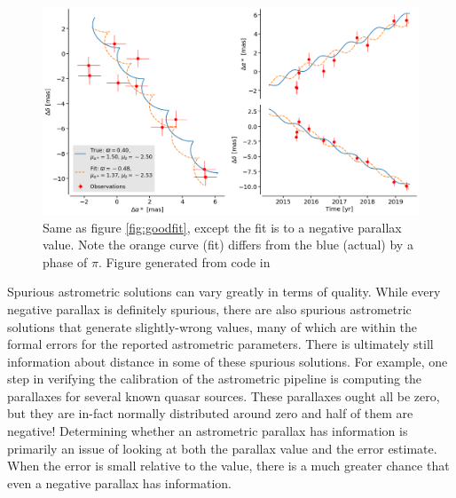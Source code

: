 \documentclass[twocolumn]{aastex631}
\begin{document}
\begin{figure}
	\includegraphics[width=\columnwidth]{astrometric-bad.png}
	\caption{Same as figure \ref{fig:goodfit}, except the fit is to a negative parallax value. Note the orange curve (fit) differs from the blue (actual) by a phase of $\pi$. Figure generated from code in \cite{luriGaia2018}}
	\label{fig:badfit}
\end{figure}



Spurious astrometric solutions can vary greatly in terms of quality. While every negative parallax is definitely spurious, there are also spurious astrometric solutions that generate slightly-wrong values, many of which are within the formal errors for the reported astrometric parameters. There is ultimately still information about distance in some of these spurious solutions. For example, one step in verifying the calibration of the astrometric pipeline is computing the parallaxes for several known quasar sources\citep{luriGaia2018}. These parallaxes ought all be zero, but they are in-fact normally distributed around zero and half of them are negative! Determining whether an astrometric parallax has information is primarily an issue of looking at both the parallax value and the error estimate. When the error is small relative to the value, there is a much greater chance that even a negative parallax has information.
\end{document}
